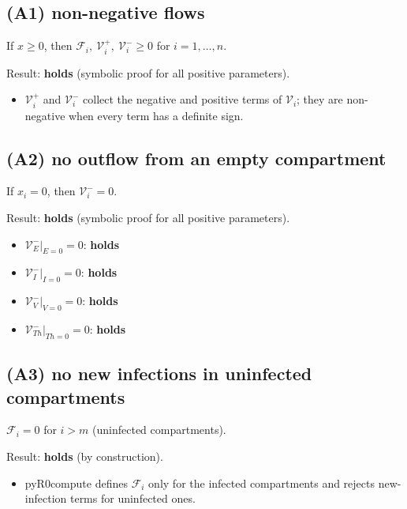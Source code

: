 \documentclass{article}
\begin{document}
\subsection*{(A1) non-negative flows}

If $x \ge 0$, then $\mathcal{F}_i,\ \mathcal{V}_i^+,\ \mathcal{V}_i^- \ge 0$ for $i = 1,\dots,n$.

Result: \textbf{holds} (symbolic proof for all positive parameters).

\begin{itemize}
  \item $\mathcal{V}_i^+$ and $\mathcal{V}_i^-$ collect the negative and positive terms of $\mathcal{V}_i$; they are non-negative when every term has a definite sign.
\end{itemize}

\subsection*{(A2) no outflow from an empty compartment}

If $x_i = 0$, then $\mathcal{V}_i^- = 0$.

Result: \textbf{holds} (symbolic proof for all positive parameters).

\begin{itemize}
  \item $\left.\mathcal{V}_{E}^-\right\rvert_{E = 0} = 0$: \textbf{holds}
  \item $\left.\mathcal{V}_{I}^-\right\rvert_{I = 0} = 0$: \textbf{holds}
  \item $\left.\mathcal{V}_{V}^-\right\rvert_{V = 0} = 0$: \textbf{holds}
  \item $\left.\mathcal{V}_{Th}^-\right\rvert_{Th = 0} = 0$: \textbf{holds}
\end{itemize}

\subsection*{(A3) no new infections in uninfected compartments}

$\mathcal{F}_i = 0$ for $i > m$ (uninfected compartments).

Result: \textbf{holds} (by construction).

\begin{itemize}
  \item pyR0compute defines $\mathcal{F}_i$ only for the infected compartments and rejects new-infection terms for uninfected ones.
\end{itemize}
\end{document}

